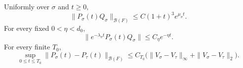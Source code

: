 \begin{proposition}
  \label{P:compact-F-complement}
  Uniformly over $\sigma$ and $t \ge 0$,
  \begin{equation}\label{E:compact-F-complement}
    \|P_\sigma(t)Q_\sigma\|_{\mathcal{B}(F)}
    \le C(1+t)^3e^{\mu_\sigma t}.
  \end{equation}
  For every fixed $0 < \eta < d_0$,
  \begin{equation}\label{E:compact-normalized-complement}
    \|e^{-\lambda_\sigma t}P_\sigma(t)Q_\sigma\|
    \le C_\eta e^{-\eta t}.
  \end{equation}
  For every finite $T_0$,
  \begin{equation}\label{E:compact-parameter-flow}
    \sup_{0\le t\le T_0}\|P_\sigma(t)-P_\tau(t)\|_{\mathcal{B}(F)}
    \le C_{T_0}
    \big(\|V_\sigma-V_\tau\|_\infty+\|V_\sigma-V_\tau\|_2\big).
  \end{equation}
\end{proposition}

